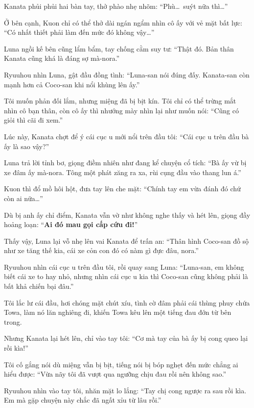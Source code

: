 \documentclass[../main.tex]{subfiles}
\begin{document}
Kanata phủi phủi hai bàn tay, thở phào nhẹ nhõm: ``Phù\dots\ suýt nữa thì\dots''

Ở bên cạnh, Kuon chỉ có thể thở dài ngán ngẩm nhìn cô ấy với vẻ mặt bất lực: ``Có nhất thiết phải làm đến mức đó không vậy\dots''

Luna ngồi kế bên cũng lẩm bẩm, tay chống cằm suy tư: ``Thật đó. Bản thân Kanata cũng khá là đáng sợ mà-nora.''

Ryuuhou nhìn Luna, gật đầu đồng tình: ``Luna-san nói đúng đấy. Kanata-san còn mạnh hơn cả Coco-san khi nổi khùng lên ấy.''

Tôi muốn phản đối lắm, nhưng miệng đã bị bịt kín. Tôi chỉ có thể trừng mắt nhìn cô bạn thân, còn cô ấy thì nhướng mày nhìn lại như muốn nói: ``Cũng có giỏi thì cãi đi xem.''

Lúc này, Kanata chợt để ý cái cục u mới nổi trên đầu tôi: ``Cái cục u trên đầu bà ấy là sao vậy?''

Luna trả lời tỉnh bơ, giọng điềm nhiên như đang kể chuyện cổ tích: ``Bà ấy vừ bị xe đâm ấy mà-nora. Tông một phát zăng ra xa, rùi cụng đầu vào thang lun á.''

Kuon thì đổ mồ hôi hột, đưa tay lên che mặt: ``Chính tay em vừa đánh đó chứ còn ai nữa\dots''

Dù bị anh ấy chỉ điểm, Kanata vẫn vờ như không nghe thấy và hét lên, giọng đầy hoảng loạn: ``\textbf{Ai đó mau gọi cấp cứu đi!}''

Thấy vậy, Luna lại vỗ nhẹ lên vai Kanata để trấn an: ``Thân hình Coco-san đồ sộ như xe tăng thế kia, cái xe cỏn con đó có nàm gì đực đâu, nora.''

Ryuuhou nhìn cái cục u trên đầu tôi, rồi quay sang Luna: ``Luna-san, em không biết cái xe to hay nhỏ, nhưng nhìn cái cục u kia thì Coco-san cũng không phải là bất khả chiến bại đâu.''

Tôi lắc lư cái đầu, hơi chóng mặt chút xíu, tình cờ đâm phải cái thùng phuy chứa Towa, làm nó lăn nghiêng đi, khiến Towa kêu lên một tiếng đau đớn từ bên trong.

Nhưng Kanata lại hét lên, chỉ vào tay tôi: ``Cơ mà tay của bà ấy bị cong queo lại rồi kìa!''


Tôi cố gắng nói dù miệng vẫn bị bịt, tiếng nói bị bóp nghẹt đến mức chẳng ai hiểu được: ``Vừa nãy tôi đã vượt qua ngưỡng chịu đau rồi nên không sao.''

Ryuuhou nhìn vào tay tôi, nhăn mặt lo lắng: ``Tay chị cong ngược ra sau rồi kìa. Em mà gặp chuyện này chắc đã ngất xỉu từ lâu rồi.''
\end{document}
